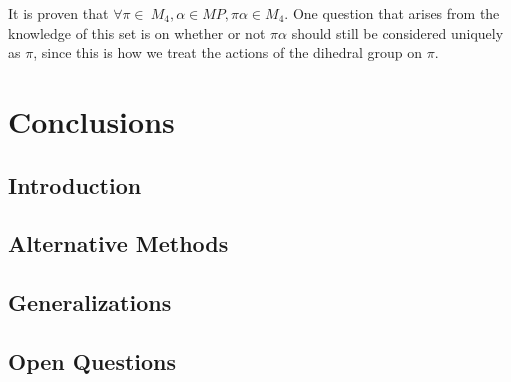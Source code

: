 \documentclass[12pt]{report}
\begin{document}
\par It is proven that $\forall\pi\in\ M_4,\alpha\in MP, \pi\alpha \in M_4$. One question that
arises from the knowledge of this set is on whether or not $\pi\alpha$ should still be considered
uniquely as $\pi$, since this is how we treat the actions of the dihedral group on $\pi$.

\chapter{Conclusions}

\section{Introduction}

\section{Alternative Methods}

\section{Generalizations}

\section{Open Questions}

\nocite{*}
\printbibliography{}
\end{document}
